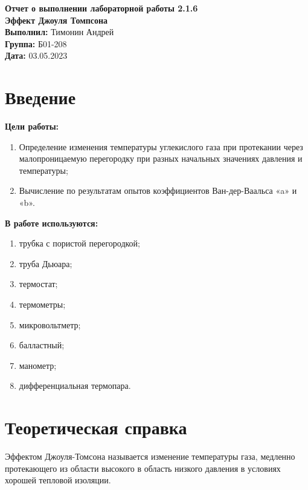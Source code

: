 \documentclass[a4paper, 12pt]{article}
\begin{document}
	\begin{Huge}
		\begin{center}
			\textbf{Отчет о выполнении лабораторной работы 2.1.6}\\
			\vspace{2em}
			\textbf{Эффект Джоуля Томпсона}\\
			\vspace{5em}
			\textbf{Выполнил: }Тимонин Андрей\\
			\textbf{Группа: }Б01-208\\
			\vspace{9em}
			\textbf{Дата: }03.05.2023\\
		\end{center}
	\end{Huge}
	
	\section{Введение}
	\noindent\textbf{Цели работы:}	
	\begin{enumerate}
		\item Определение изменения температуры углекислого газа при протекании через малопроницаемую перегородку при разных начальных значениях давления и температуры;
		\item Вычисление по результатам опытов коэффициентов Ван-дер-Ваальса «a» и «b».
	\end{enumerate}
	\bigskip
	
	\noindent\textbf{В работе используются:}
	\begin{enumerate}
		\item трубка с пористой перегородкой;
		\item труба Дьюара;
		\item термостат;
		\item термометры;
		\item микровольтметр;
		\item балластный;
		\item манометр;
		\item дифференциальная термопара.
	\end{enumerate}
	\section{Теоретическая справка}
	
	Эффектом Джоуля-Томсона называется изменение температуры газа, медленно протекающего из области высокого в область низкого давления в условиях хорошей тепловой изоляции.
	
\end{document}
